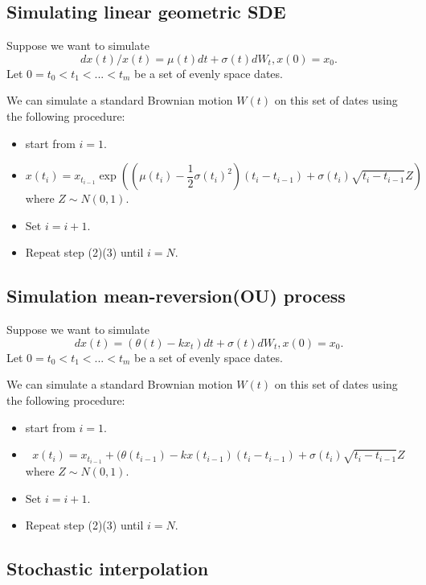 \begin{refsection}
\subsection{Simulating linear geometric SDE}

\begin{method}\cite[104]{glasserman2003monte}
	Suppose we want to simulate
	$$dx(t)/x(t) = \mu(t)dt + \sigma(t)dW_t, x(0) = x_0.$$
	Let $0=t_0<t_1<...<t_m$ be a set of evenly space dates.
	
	We can simulate a standard Brownian motion $W(t)$ on this set of dates using the following procedure:
	\begin{itemize}
		\item start from $i=1$.
		\item $$x(t_{i}) = x_{t_{i-1}}\exp(  (\mu(t_i) - \frac{1}{2}\sigma(t_i)^2)(t_{i}-t_{i-1}) + \sigma(t_i)\sqrt{t_{i}-t_{i-1}}Z)$$
		where $Z\sim N(0,1)$.
		\item Set $i=i+1$.
		\item Repeat step (2)(3) until $i=N$.
	\end{itemize}
\end{method}



\subsection{Simulation mean-reversion(OU) process}

\begin{method}\cite[104]{glasserman2003monte}
	Suppose we want to simulate
$$dx(t) = (\theta(t)-kx_t)dt + \sigma(t)dW_t, x(0) = x_0.$$
Let $0=t_0<t_1<...<t_m$ be a set of evenly space dates.

We can simulate a standard Brownian motion $W(t)$ on this set of dates using the following procedure:
\begin{itemize}
	\item start from $i=1$.
	\item $$x(t_{i}) = x_{t_{i-1}} + (\theta(t_{i-1}) - kx(t_{i-1})(t_i-t_{i-1})  + \sigma(t_i)\sqrt{t_{i}-t_{i-1}}Z$$
	where $Z\sim N(0,1)$.
	\item Set $i=i+1$.
	\item Repeat step (2)(3) until $i=N$.
\end{itemize}	
\end{method}




\subsection{Stochastic interpolation}


\end{refsection}
